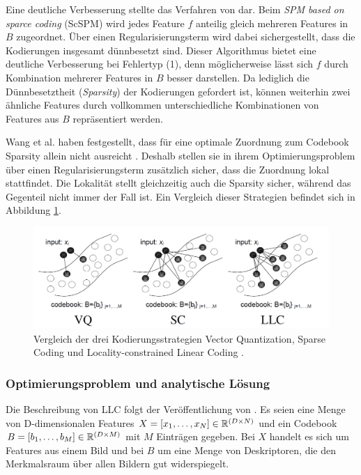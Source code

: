Eine deutliche Verbesserung stellte das Verfahren von \cite{yygh09} dar. Beim \emph{SPM based on sparce coding} (ScSPM) wird jedes Feature $f$ anteilig gleich mehreren Features in $B$ zugeordnet. Über einen Regularisierungsterm wird dabei sichergestellt, dass die Kodierungen insgesamt dünnbesetzt sind. Dieser Algorithmus bietet eine deutliche Verbesserung bei Fehlertyp (1), denn möglicherweise lässt sich $f$ durch Kombination mehrerer Features in $B$ besser darstellen. Da lediglich die Dünnbesetztheit (\emph{Sparsity}) der Kodierungen gefordert ist, können weiterhin zwei ähnliche Features durch vollkommen unterschiedliche Kombinationen von Features aus $B$ repräsentiert werden.

Wang et al. haben festgestellt, dass für eine optimale Zuordnung zum Codebook Sparsity allein nicht ausreicht \cite{wyylhg10}. Deshalb stellen sie in ihrem Optimierungsproblem über einen Regularisierungsterm zusätzlich sicher, dass die Zuordnung lokal stattfindet. Die Lokalität stellt gleichzeitig auch die Sparsity sicher, während das Gegenteil nicht immer der Fall ist. Ein Vergleich dieser Strategien befindet sich in Abbildung \ref{img:quant_comp}.

\begin{figure}
	\centering
	\includegraphics[scale=0.5]{img/quant_comp.png}
	\caption{Vergleich der drei Kodierungsstrategien Vector Quantization, Sparse Coding und Locality-constrained Linear Coding \cite{wyylhg10}.}
	\label{img:quant_comp}
\end{figure}

\subsubsection{Optimierungsproblem und analytische Lösung}
\label{sec:llc}

Die Beschreibung von LLC folgt der Veröffentlichung von \cite{wyylhg10}. Es seien eine Menge von D-dimensionalen Features $X = [x_1, \dots, x_N] \in \mathbb{R}^{(D \times N)}$ und ein Codebook $B = [b_1, \dots, b_M] \in \mathbb{R}^{(D \times M)}$ mit $M$ Einträgen gegeben. Bei $X$ handelt es sich um Features aus einem Bild und bei $B$ um eine Menge von Deskriptoren, die den Merkmalsraum über allen Bildern gut widerspiegelt.
 
